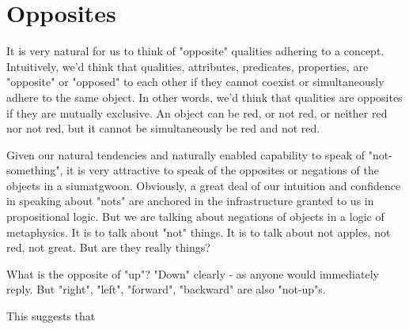 \section{Opposites}

It is very natural for us to think of "opposite" qualities adhering to a concept. Intuitively, we'd think that qualities, attributes, predicates, properties, are "opposite" or "opposed" to each other if they cannot coexist or simultaneously adhere to the same object. In other words, we'd think that qualities are opposites if they are mutually exclusive. An object can be red, or not red, or neither red nor not red, but it cannot be simultaneously be red and not red.

Given our natural tendencies and naturally enabled capability to speak of "not-something", it is very attractive to speak of the opposites or negations of the objects in a siumatgwoon. Obviously, a great deal of our intuition and confidence in speaking about "nots" are anchored in the infrastructure granted to us in propositional logic. But we are talking about negations of objects in a logic of metaphysics. It is to talk about "not" things. It is to talk about not apples, not red, not great. But are they really things? 

What is the opposite of "up"? "Down" clearly - as anyone would immediately reply. But "right", "left", "forward", "backward" are also "not-up"s. 

This suggests that 



